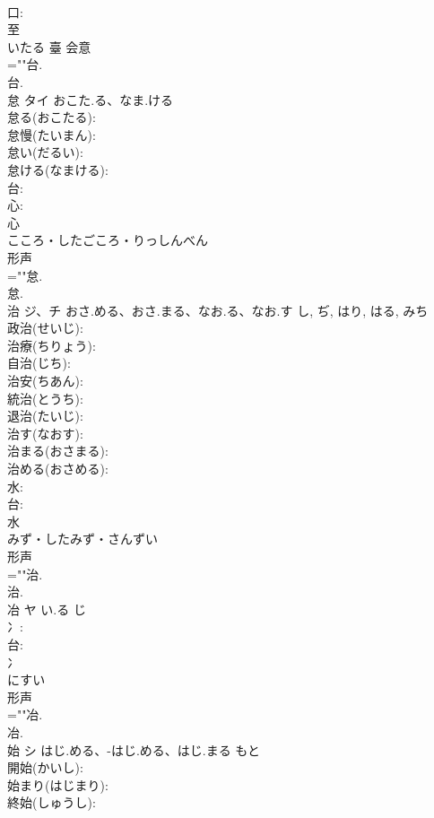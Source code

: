 \documentclass[8pt]{extreport}
\begin{document}
\begin{CJK}{UTF8}{min}
\\	口: 
\\	至	
\\	いたる	臺	会意 
\\	=""台.
\\	台.
\\	怠	タイ	おこた.る、なま.ける		
\\	怠る(おこたる): 
\\	怠慢(たいまん): 
\\	怠い(だるい): 
\\	怠ける(なまける): 
\\	台: 
\\	心: 
\\	心	
\\	こころ・したごころ・りっしんべん	
\\	形声 
\\	=""怠.
\\	怠.
\\	治	ジ、チ	おさ.める、おさ.まる、なお.る、なお.す	し, ぢ, はり, はる, みち	
\\	政治(せいじ): 
\\	治療(ちりょう): 
\\	自治(じち): 
\\	治安(ちあん): 
\\	統治(とうち): 
\\	退治(たいじ): 
\\	治す(なおす): 
\\	治まる(おさまる): 
\\	治める(おさめる): 
\\	水: 
\\	台: 
\\	水	
\\	みず・したみず・さんずい	
\\	形声 
\\	=""治.
\\	治.
\\	冶	ヤ	い.る	じ	
\\	冫: 
\\	台: 
\\	冫	
\\	にすい	
\\	形声 
\\	=""冶.
\\	冶.
\\	始	シ	はじ.める、-はじ.める、はじ.まる	もと	
\\	開始(かいし): 
\\	始まり(はじまり): 
\\	終始(しゅうし): 

\end{CJK}
\end{document}
